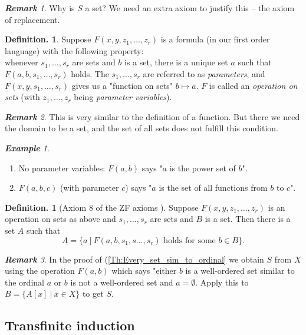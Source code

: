 \documentclass[a4paper,oneside,11pt,DIV=12,parskip=half]{scrartcl}
\theoremstyle{plain}
\theoremstyle{definition}
\newtheorem{definition}[theorem]{Definition.}
\newtheorem{remark, definition}[theorem]{Remark and Definition.}
\newtheorem{lemma, definition}[theorem]{Lemma and Definition.}
\newtheorem{theorem, definition}[theorem]{Theorem and Definition.}
\theoremstyle{remark}
\newtheorem*{remark}{\textbf{Remark}}
\newtheorem*{example}{\textbf{Example}}
\newtheorem*{remark, example}{\textbf{Remark and Exercise}}
\begin{document}
\begin{remark}
Why is $S$ a set? We need an extra axiom to justify this -- the axiom of replacement.
\end{remark}

\begin{definition}
Suppose $F(x,y,z_1,\dots,z_r)$ is a formula (in our first order language) with the following property:\\
whenever $s_1,\dots,s_r$ are sets and $b$ is a set, there is a unique set $a$ such that $F(a,b,s_1,\dots,s_r)$ holds. The $s_1,\dots,s_r$ are referred to as \emph{parameters}, and $F(x,y,s_1,\dots,s_r)$ gives us a "function on sets" $b \mapsto a$. $F$ is called an \emph{operation on sets} (with $z_1,\dots,z_r$ being \emph{parameter variables}).
\end{definition}

\begin{remark}
This is very similar to the definition of a function. But there we need the domain to be a set, and the set of all sets does not fulfill this condition.
\end{remark}

\begin{example}
\begin{enumerate}
    \item No parameter variables: $F(a,b)$ says "$a$ is the power set of $b$".
    \item $F(a,b,c)$ (with parameter $c$) says "$a$ is the set of all functions from $b$ to $c$".
\end{enumerate}
\end{example}

\begin{definition}[Axiom 8 of the ZF axioms ]
Suppose $F(x,y, z_1,\dots,z_r) $ is an operation on sets as above and $s_1,\dots,s_r$ are sets and $B$ is a set. Then there is a set $A$ such that
    \[ A = \{ a ~|~ F(a,b,s_1,s\dots,s_r) \text{ holds for some $b \in B$} \}. \]
\end{definition}

\begin{remark}
In the proof of (\ref{Th:Every_set_sim_to_ordinal} we obtain $S$ from $X$ using the operation $F(a,b)$ which says "either $b$ is a well-ordered set similar to the ordinal $a$ or $b$ is not a well-ordered set and $a = \emptyset$. Apply this to $B = \{ A[x] ~|~ x \in X \}$ to get $S$.
\end{remark}

\subsection{Transfinite induction}
\end{document}
